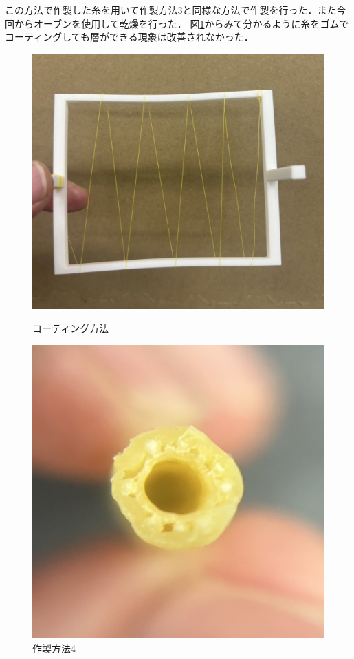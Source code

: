 この方法で作製した糸を用いて作製方法3と同様な方法で作製を行った．また今回からオーブンを使用して乾燥を行った．
図\ref{fig:27}からみて分かるように糸をゴムでコーティングしても層ができる現象は改善されなかった．
\begin{figure}[t]
  \centering
  \begin{minipage}[b]{0.49\hsize}
      \centering
      \includegraphics[scale=0.2]{pic/25.jpg}
  \caption{コーティング方法}
  \label{fig:26}
  \end{minipage} \hfill
  \begin{minipage}[b]{0.49\hsize}
      \centering
      \includegraphics[scale=0.4]{pic/26.jpg}
  \caption{作製方法4}
  \label{fig:27}
  \end{minipage} 
\end{figure}

